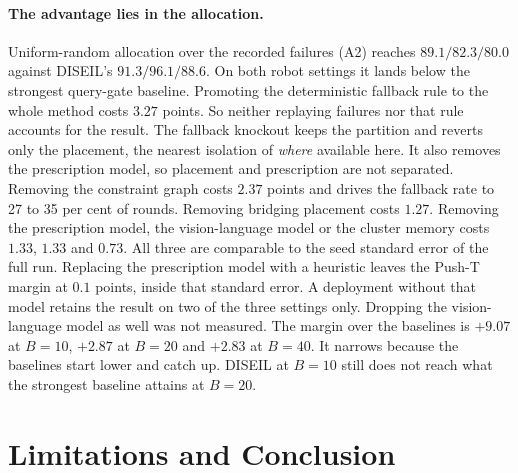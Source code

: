 \paragraph{The advantage lies in the allocation.}
Uniform-random allocation over the recorded failures (A2) reaches $89.1 / 82.3 / 80.0$
against DISEIL's $91.3 / 96.1 / 88.6$. On both robot settings it lands below the
strongest query-gate baseline. Promoting the deterministic fallback rule to the whole
method costs $3.27$ points. So neither replaying failures nor that rule accounts for
the result. The fallback knockout keeps the partition and reverts only the placement,
the nearest isolation of \emph{where} available here. It also removes the prescription
model, so placement and prescription are not separated. Removing the constraint graph
costs $2.37$ points and drives the fallback rate to 27 to 35 per cent of rounds.
Removing bridging placement costs $1.27$. Removing the prescription model, the
vision-language model or the cluster memory costs $1.33$, $1.33$ and $0.73$. All
three are comparable to the seed standard error of the full run. Replacing the
prescription model with a heuristic leaves the Push-T margin at $0.1$ points, inside
that standard error. A deployment without that model retains the result on two of the
three settings only. Dropping the vision-language model as well was not measured. The
margin over the baselines is $+9.07$ at $B{=}10$, $+2.87$ at $B{=}20$ and $+2.83$ at
$B{=}40$. It narrows because the baselines start lower and catch up. DISEIL at
$B{=}10$ still does not reach what the strongest baseline attains at $B{=}20$.

\section{Limitations and Conclusion}

